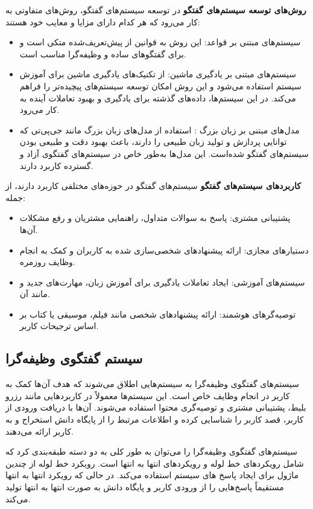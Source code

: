 \textbf{روش‌های توسعه سیستم‌های گفتگو}\newline
در توسعه سیستم‌های گفتگو، روش‌های متفاوتی به کار می‌رود که هر کدام دارای مزایا و معایب خود هستند:

\begin{itemize}
\item
سیستم‌های مبتنی بر قواعد: این روش به قوانین از پیش‌تعریف‌شده متکی است و برای گفتگوهای ساده و وظیفه‌گرا مناسب است.
\item
سیستم‌های مبتنی بر یادگیری ماشین: از تکنیک‌های یادگیری ماشین برای آموزش سیستم استفاده می‌شود و این روش امکان توسعه سیستم‌های پیچیده‌تر را فراهم می‌کند. در این سیستم‌ها، داده‌های گذشته برای یادگیری و بهبود تعاملات آینده به کار می‌رود.
\item
مدل‌های مبتنی بر زبان بزرگ%
: استفاده از مدل‌های زبان بزرگ مانند جی‌پی‌تی که توانایی پردازش و تولید زبان طبیعی را دارند، باعث بهبود دقت و طبیعی بودن سیستم‌های گفتگو شده‌است. این مدل‌ها به‌طور خاص در سیستم‌های گفتگوی آزاد و گسترده کاربرد دارند.

\end{itemize}

\textbf{کاربردهای سیستم‌های گفتگو}\newline
سیستم‌های گفتگو در حوزه‌های مختلفی کاربرد دارند، از جمله:
\begin{itemize}
\item
پشتیبانی مشتری: پاسخ به سوالات متداول، راهنمایی مشتریان و رفع مشکلات آن‌ها.
\item
دستیارهای مجازی: ارائه پیشنهادهای شخصی‌سازی شده به کاربران و کمک به انجام وظایف روزمره.
\item
سیستم‌های آموزشی: ایجاد تعاملات یادگیری برای آموزش زبان، مهارت‌های جدید و مانند آن.
\item
توصیه‌گرهای هوشمند: ارائه پیشنهادهای شخصی مانند فیلم، موسیقی یا کتاب بر اساس ترجیحات کاربر.
\end{itemize}

\subsection{سیستم گفتگوی وظیفه‌گرا}
سیستم‌های گفتگوی وظیفه‌گرا به سیستم‌هایی اطلاق می‌شوند که هدف آن‌ها کمک به کاربر در انجام وظایف خاص است. این سیستم‌ها معمولاً در کاربردهایی مانند رزرو بلیط، پشتیبانی مشتری و توصیه‌گری محتوا استفاده می‌شوند. آن‌ها با دریافت ورودی از کاربر، قصد کاربر را شناسایی کرده و اطلاعات مرتبط را از پایگاه دانش استخراج و به کاربر ارائه می‌دهند.

سیستم‌های گفتگوی وظیفه‌گرا را می‌توان به طور کلی به دو دسته طبقه‌بندی کرد که شامل رویکردهای 
خط لوله
 و رویکردهای 
انتها به انتها
 است. رویکرد خط لوله از چندین ماژول برای ایجاد پاسخ های سیستم استفاده می‌کند. در حالی که رویکرد انتها به انتها مستقیماً پاسخ‌هایی را از ورودی کاربر و 
پایگاه دانش
 به صورت انتها به انتها تولید می‌کند.%
\cite{chung2023instructtods}

